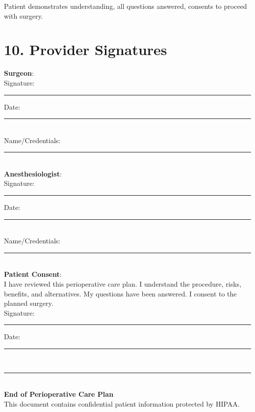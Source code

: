 \documentclass[11pt,letterpaper]{article}
\begin{document}
Patient demonstrates understanding, all questions answered, consents to proceed with surgery.

\vspace{2em}

\section*{10. Provider Signatures}

\textbf{Surgeon}:\\[0.5em]
Signature: \rule{6cm}{0.5pt} \quad Date: \rule{3cm}{0.5pt}\\
Name/Credentials: \rule{6cm}{0.5pt}\\[1em]

\textbf{Anesthesiologist}:\\[0.5em]
Signature: \rule{6cm}{0.5pt} \quad Date: \rule{3cm}{0.5pt}\\
Name/Credentials: \rule{6cm}{0.5pt}\\[1em]

\textbf{Patient Consent}:\\[0.5em]
I have reviewed this perioperative care plan. I understand the procedure, risks, benefits, and alternatives. My questions have been answered. I consent to the planned surgery.\\[0.5em]
Signature: \rule{6cm}{0.5pt} \quad Date: \rule{3cm}{0.5pt}\\

\vspace{2em}
\begin{center}
\rule{\textwidth}{1pt}\\
\textbf{End of Perioperative Care Plan}\\
This document contains confidential patient information protected by HIPAA.
\end{center}
\end{document}
